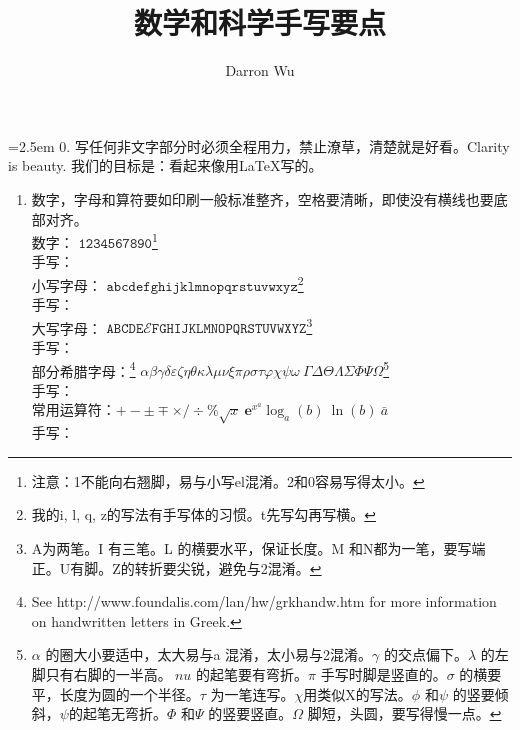 \documentclass[11pt, a4paper]{article}
\begin{document}
\title{数学和科学手写要点\\ }
\author{Darron Wu}
\date{}
\maketitle


\setlength{\parindent}{1.25em} %
\hangindent=2.5em
0. 写任何非文字部分时必须全程用力，禁止潦草，清楚就是好看。Clarity is beauty. 我们的目标是：看起来像用\LaTeX 写的。

\begin{enumerate}
\item 数字，字母和算符要如印刷一般标准整齐，空格要清晰，即使没有横线也要底部对齐。\\
    数字：{\fontsize{13pt}{1} $\mathtt{1234567890}$}\footnote{注意：1不能向右翘脚，易与小写el混淆。2和0容易写得太小。}\\ 手写：\\[7pt]
    小写字母：{\fontsize{13pt}{1} $\mathtt{abcdefghijklmnopqrstuvwxyz}$}\footnote{我的i, l, q, z的写法有手写体的习惯。t先写勾再写横。}\\ 手写：\\[7pt]
    大写字母：{\fontsize{13pt}{1} $\mathtt{ABCDE}\mathcal{E}\mathtt{FGHIJKLMNOPQRSTUVWXYZ}$}\footnote{A为两笔。I 有三笔。L 的横要水平，保证长度。M 和N都为一笔，要写端正。U有脚。Z的转折要尖锐，避免与2混淆。}\\ 手写：\\[7pt]
    部分希腊字母：\footnote{See http://www.foundalis.com/lan/hw/grkhandw.htm for more information on handwritten letters in Greek.}{\fontsize{13pt}{1} $\alpha \beta \gamma \delta \varepsilon \zeta \eta \theta \kappa \lambda \mu \nu \xi \pi \rho \sigma \tau \varphi \chi \psi \omega \: \Gamma \Delta \Theta \Lambda \Sigma \Phi \Psi \Omega$}\footnote{$\alpha$ 的圈大小要适中，太大易与a 混淆，太小易与2混淆。$\gamma$ 的交点偏下。$\lambda$ 的左脚只有右脚的一半高。$\ nu$ 的起笔要有弯折。$\pi$ 手写时脚是竖直的。$\sigma$ 的横要平，长度为圆的一个半径。$\tau$ 为一笔连写。$\chi$用类似X的写法。$\phi$ 和$\psi$ 的竖要倾斜，$\psi$的起笔无弯折。$\Phi$ 和$\Psi$ 的竖要竖直。$\Omega$ 脚短，头圆，要写得慢一点。}\\ 手写：\\[7pt]
    常用运算符：$+ - \pm \mp \times / \div \% \sqrt{x} \ \mathbf{e}^{{x}^{a}} \log_a(b) \: \ln(b) \ \bar{a}$\\ 手写：\\[7pt]

\end{enumerate}
\end{document}

